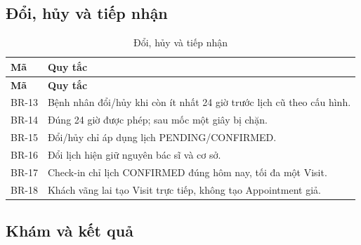 \clearpage

\subsection{Đổi, hủy và tiếp nhận}

{\small\setlength{\tabcolsep}{3pt}\renewcommand{\arraystretch}{1.12}
\begin{longtable}{@{}L{\textwidth-0.72pt\relax} L{\textwidth-5.28pt\relax}@{}}
\caption{Đổi, hủy và tiếp nhận}\\
\toprule
\textbf{Mã} & \textbf{Quy tắc}\\\midrule
\endfirsthead
\toprule
\textbf{Mã} & \textbf{Quy tắc}\\\midrule
\endhead
\bottomrule\endlastfoot
BR-13 & Bệnh nhân đổi/\allowbreak{}hủy khi còn ít nhất 24 giờ trước lịch cũ theo cấu hình.\allowbreak{}\\[3pt]
BR-14 & Đúng 24 giờ được phép; sau mốc một giây bị chặn.\allowbreak{}\\[3pt]
BR-15 & Đổi/\allowbreak{}hủy chỉ áp dụng lịch PENDING/\allowbreak{}CONFIRMED.\allowbreak{}\\[3pt]
BR-16 & Đổi lịch hiện giữ nguyên bác sĩ và cơ sở.\allowbreak{}\\[3pt]
BR-17 & Check-in chỉ lịch CONFIRMED đúng hôm nay, tối đa một Visit.\allowbreak{}\\[3pt]
BR-18 & Khách vãng lai tạo Visit trực tiếp, không tạo Appointment giả.\allowbreak{}\\[3pt]
\end{longtable}}

\subsection{Khám và kết quả}

